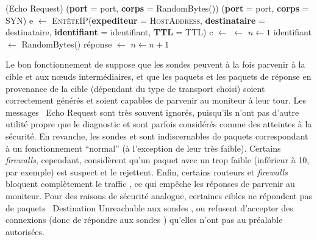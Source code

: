 \begin{algorithm}
\caption{\traceroute}
\label{alg:traceroute}
\begin{algorithmic}
	 \icmp({\sc Echo Request})
	 \udp({\bf port} = port, {\bf corps} = {\sc RandomBytes}())
	 \tcp({\bf port} = port, {\bf corps} = {\sc SYN})
\EndIf
\EndFunction
{} \State e $\gets$ \textsc{EntêteIP}(\textbf{expediteur} =
\textsc{HostAddress}, \textbf{destinataire} = destinataire,
\textbf{identifiant} = identifiant, \textbf{TTL} = TTL)
\State c $\gets$ 
 $\gets$ 
\State {}
\EndProcedure
{}
\State $n \gets 1$
\State {}
\Loop
	\State identifiant $\gets$ {\sc RandomBytes()}
	\State {}
	\State réponse $\gets$ 
		\State {}
		\State {}
	\Else
		\State {}
	\EndIf
	\State $n \gets n + 1$
\EndLoop
\EndProcedure
\end{algorithmic}
\end{algorithm}

Le bon fonctionnement de \traceroute suppose que les sondes peuvent à la fois
parvenir à la cible et aux n\oe{}uds intermédiaires, et que les paquets
\icmptimeout et les paquets de réponse en provenance de la cible (dépendant du
type de transport choisi) soient correctement générés et soient capables de
parvenir au moniteur à leur tour. Les messages \icmp~{\sc Echo Request} sont
très souvent ignorés, puisqu'ils n'ont pas d'autre utilité propre que le
diagnostic et sont parfois considérés comme des atteintes à la sécurité. En
revanche, les sondes \tcp et \udp sont indiscernables de paquets correspondant à
un fonctionnement ``normal'' (à l'exception de leur \ttl très faible). Certains
{\em firewalls}, cependant, considèrent qu'un paquet avec un \ttl trop faible
(inférieur à 10, par exemple) est suspect et le rejettent. Enfin, certains
routeurs et {\em firewalls} bloquent complètement le traffic \icmp, ce qui
empêche les réponses \icmptimeout de parvenir au moniteur.
Pour des raisons de sécurité analogue, certaines cibles ne répondent pas de
paquets \icmp~{\sc Destination Unreachable} aux sondes \udp, ou refusent
d'accepter des connexions \tcp (donc de répondre aux sondes \tcp) qu'elles
n'ont pas au préalable autorisées.

